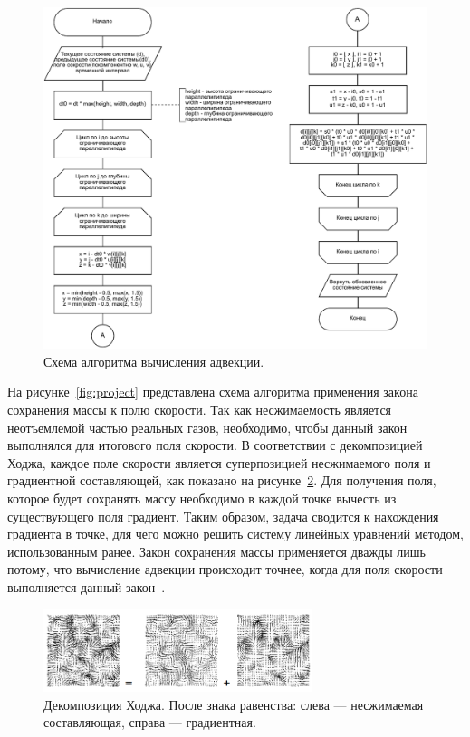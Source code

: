 \begin{figure}[H]
	\centering
	\includegraphics[width=1.0\textwidth,page=1]{assets/img/advect.pdf}
	\caption{Схема алгоритма вычисления адвекции.}
	\label{fig:advect}
\end{figure}

На рисунке~\ref{fig:project} представлена схема алгоритма применения закона сохранения массы к полю скорости. Так как несжимаемость является неотъемлемой частью реальных газов, необходимо, чтобы данный закон выполнялся для итогового поля скорости. В соответствии с декомпозицией Ходжа, каждое поле скорости является суперпозицией несжимаемого поля и градиентной составляющей, как показано на рисунке~\ref{fig:hodge}. Для получения поля, которое будет сохранять массу необходимо в каждой точке вычесть из существующего поля градиент. Таким образом, задача сводится к нахождения градиента в точке, для чего можно решить систему линейных уравнений методом, использованным ранее. Закон сохранения массы применяется дважды лишь потому, что вычисление адвекции происходит точнее, когда для поля скорости выполняется данный закон~\cite{stam}.

\begin{figure}[H]
	\centering
	\includegraphics[width=0.7\textwidth,page=1]{assets/img/hodge.png}
	\caption{Декомпозиция Ходжа. После знака равенства: слева --- несжимаемая составляющая, справа --- градиентная.}
	\label{fig:hodge}
\end{figure}

